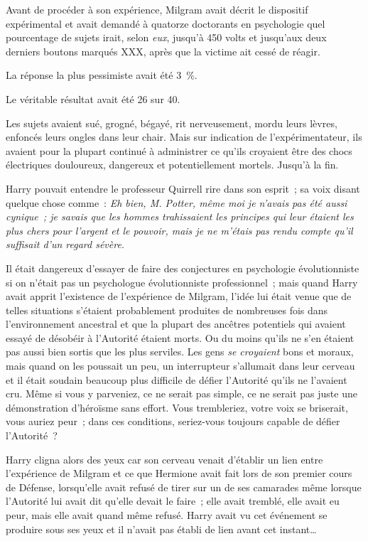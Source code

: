 Avant de procéder à son expérience, Milgram avait décrit le dispositif expérimental et avait demandé à quatorze doctorants en psychologie quel pourcentage de sujets irait, selon \emph{eux}, jusqu'à 450 volts et jusqu'aux deux derniers boutons marqués XXX, après que la victime ait cessé de réagir.

La réponse la plus pessimiste avait été 3~\%.

Le véritable résultat avait été 26 sur 40.

Les sujets avaient sué, grogné, bégayé, rit nerveusement, mordu leurs lèvres, enfoncés leurs ongles dans leur chair. Mais sur indication de l'expérimentateur, ils avaient pour la plupart continué à administrer ce qu'ils croyaient être des chocs électriques douloureux, dangereux et potentiellement mortels. Jusqu'à la fin.

Harry pouvait entendre le professeur Quirrell rire dans son esprit~; sa voix disant quelque chose comme~: \emph{Eh bien, M. Potter, même moi je n'avais pas été aussi cynique~; je savais que les hommes trahissaient les principes qui leur étaient les plus chers pour l'argent et le pouvoir, mais je ne m'étais pas rendu compte qu'il suffisait d'un regard sévère.}

Il était dangereux d'essayer de faire des conjectures en psychologie évolutionniste si on n'était pas un psychologue évolutionniste professionnel~; mais quand Harry avait apprit l'existence de l'expérience de Milgram, l'idée lui était venue que de telles situations s'étaient probablement produites de nombreuses fois dans l'environnement ancestral et que la plupart des ancêtres potentiels qui avaient essayé de désobéir à l'Autorité étaient morts. Ou du moins qu'ils ne s'en étaient pas aussi bien sortis que les plus serviles. Les gens \emph{se croyaient} bons et moraux, mais quand on les poussait un peu, un interrupteur s'allumait dans leur cerveau et il était soudain beaucoup plus difficile de défier l'Autorité qu'ils ne l'avaient cru. Même si vous y parveniez, ce ne serait pas simple, ce ne serait pas juste une démonstration d'héroïsme sans effort. Vous trembleriez, votre voix se briserait, vous auriez peur~; dans ces conditions, seriez-vous toujours capable de défier l'Autorité~?

Harry cligna alors des yeux car son cerveau venait d'établir un lien entre l'expérience de Milgram et ce que Hermione avait fait lors de son premier cours de Défense, lorsqu'elle avait refusé de tirer sur un de ses camarades même lorsque l'Autorité lui avait dit qu'elle devait le faire~; elle avait tremblé, elle avait eu peur, mais elle avait quand même refusé. Harry avait vu cet événement se produire sous ses yeux et il n'avait pas établi de lien avant cet instant…

